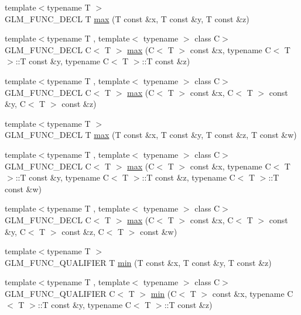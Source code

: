 \begin{DoxyCompactItemize}
\item 
{\footnotesize template$<$typename T $>$ }\\G\-L\-M\-\_\-\-F\-U\-N\-C\-\_\-\-D\-E\-C\-L T \hyperlink{group__gtx__extented__min__max_ga04991ccb9865c4c4e58488cfb209ce69}{max} (T const \&x, T const \&y, T const \&z)
\item 
{\footnotesize template$<$typename T , template$<$ typename $>$ class C$>$ }\\G\-L\-M\-\_\-\-F\-U\-N\-C\-\_\-\-D\-E\-C\-L C$<$ T $>$ \hyperlink{group__gtx__extented__min__max_gae1b7bbe5c91de4924835ea3e14530744}{max} (C$<$ T $>$ const \&x, typename C$<$ T $>$\-::T const \&y, typename C$<$ T $>$\-::T const \&z)
\item 
{\footnotesize template$<$typename T , template$<$ typename $>$ class C$>$ }\\G\-L\-M\-\_\-\-F\-U\-N\-C\-\_\-\-D\-E\-C\-L C$<$ T $>$ \hyperlink{group__gtx__extented__min__max_gaf832e9d4ab4826b2dda2fda25935a3a4}{max} (C$<$ T $>$ const \&x, C$<$ T $>$ const \&y, C$<$ T $>$ const \&z)
\item 
{\footnotesize template$<$typename T $>$ }\\G\-L\-M\-\_\-\-F\-U\-N\-C\-\_\-\-D\-E\-C\-L T \hyperlink{group__gtx__extented__min__max_ga78e04a0cef1c4863fcae1a2130500d87}{max} (T const \&x, T const \&y, T const \&z, T const \&w)
\item 
{\footnotesize template$<$typename T , template$<$ typename $>$ class C$>$ }\\G\-L\-M\-\_\-\-F\-U\-N\-C\-\_\-\-D\-E\-C\-L C$<$ T $>$ \hyperlink{group__gtx__extented__min__max_ga7cca8b53cfda402040494cdf40fbdf4a}{max} (C$<$ T $>$ const \&x, typename C$<$ T $>$\-::T const \&y, typename C$<$ T $>$\-::T const \&z, typename C$<$ T $>$\-::T const \&w)
\item 
{\footnotesize template$<$typename T , template$<$ typename $>$ class C$>$ }\\G\-L\-M\-\_\-\-F\-U\-N\-C\-\_\-\-D\-E\-C\-L C$<$ T $>$ \hyperlink{group__gtx__extented__min__max_gaacffbc466c2d08c140b181e7fd8a4858}{max} (C$<$ T $>$ const \&x, C$<$ T $>$ const \&y, C$<$ T $>$ const \&z, C$<$ T $>$ const \&w)
\item 
{\footnotesize template$<$typename T $>$ }\\G\-L\-M\-\_\-\-F\-U\-N\-C\-\_\-\-Q\-U\-A\-L\-I\-F\-I\-E\-R T \hyperlink{group__gtx__extented__min__max_ga713d3f9b3e76312c0d314e0c8611a6a6}{min} (T const \&x, T const \&y, T const \&z)
\item 
{\footnotesize template$<$typename T , template$<$ typename $>$ class C$>$ }\\G\-L\-M\-\_\-\-F\-U\-N\-C\-\_\-\-Q\-U\-A\-L\-I\-F\-I\-E\-R C$<$ T $>$ \hyperlink{group__gtx__extented__min__max_ga74d1a96e7cdbac40f6d35142d3bcbbd4}{min} (C$<$ T $>$ const \&x, typename C$<$ T $>$\-::T const \&y, typename C$<$ T $>$\-::T const \&z)

\end{DoxyCompactItemize}
